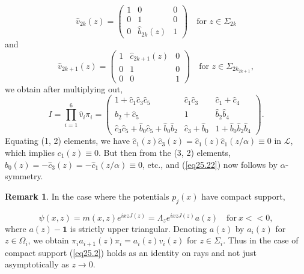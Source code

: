 \documentclass{surv-l}
\theoremstyle{plain}
\theoremstyle{definition}
\newtheorem{remark}[theorem]{Remark}
\numberwithin{equation}{chapter}
\begin{document}
\begin{equation*}
\hat{v}_{2k}(z)=\left(\begin{array}{ccc}
1 & 0 & 0\\
0 & 1 & 0\\
0 & \hat{b}_{2k}(z) & 1
\end{array}\right) \quad \text{for } z\in\Sigma_{2k}
\end{equation*}
and
\begin{equation*}
\hat{v}_{2k+1}(z)= \left(\begin{array}{ccc}
1 & \hat{c}_{2k+1}(z) & 0\\
0 & 1  & 0\\
0 & 0  & 1
\end{array}\right)\quad \text{for } z\in\Sigma_{2k_{2k+1}},
\end{equation*}
we obtain after multiplying out,
\begin{equation*}
I=\prod_{i=1}^{6}\hat{v}_{i}\pi_{i}=\left(\begin{array}{ccc}
1 + \hat{c}_{1}\hat{c}_{3}\hat{c}_{5} & \hat{c}_{1}\hat{c}_{3} & \hat{c}_{1} + \hat{c}_{4}\\
\hat{b}_{2}+\hat{c}_{5} & 1 & \hat{b}_{2}\hat{b}_{4}\\
\hat{c}_{3}\hat{c}_{5} + \hat{b}_{0}\hat{c}_{5} + \hat{b}_{0}\hat{b}_{2} & \hat{c}_{3}+\hat{b}_{0} & 1 + \hat{b}_{0}\hat{b}_{2}\hat{b}_{4}
\end{array}\right).
\end{equation*}
Equating (1, 2) elements, we have $\hat{c}_{1}(z)\hat{c}_{3}(z) =\hat{c}_{1}(z)\hat{c}_{1}(z/\alpha)\equiv 0$ in $\mathscr{L}$, which implies $c_{1}(z)\equiv 0$. But then from the (3, 2) elements, $\hat{b}_{0}(z)=-\hat{c}_{3}(z) = -\hat{c}_{1}(z/\alpha)\equiv 0$, etc., and (\ref{eq25.22}) now follows by $\alpha$-symmetry.


\renewcommand\thetheorem{25.\arabic{theorem}}
\setcounter{theorem}{22}
\begin{remark}\label{rem25.23}
In the case where the potentials $p_{j}(x)$ have compact support,
\end{remark}
\begin{equation*}
\psi(x,z)=m(x, z)e^{ixzJ(z)}=\Lambda_{z}e^{ixzJ(z)}a(z)\quad \mathrm{for}\ x < < 0,
\end{equation*}
where $a(z)-\mathbf{1}$ is strictly upper triangular. Denoting $a(z)$ by $a_{i}(z)$ for $z\in\Omega_{i}$, we obtain $\pi_{i}a_{i+1}(z)\pi_{i}=a_{i}(z)v_{i}(z)$ for $z\in\Sigma_{i}$. Thus in the case of compact support (\ref{eq25.2}) holds as an identity on rays and not just asymptotically as $z\rightarrow 0$.
\end{document}
